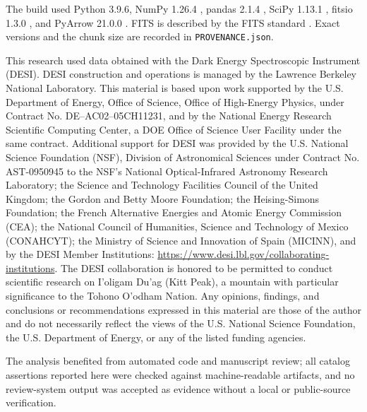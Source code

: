 \documentclass[twocolumn]{aastex701}
\begin{document}
The build used Python 3.9.6, NumPy 1.26.4 \citep{Harris2020}, pandas 2.1.4
\citep{McKinney2010}, SciPy 1.13.1 \citep{Virtanen2020}, fitsio 1.3.0
\citep{SheldonFitsio}, and PyArrow 21.0.0 \citep{ApacheArrow}.  FITS is described by
the FITS standard \citep{Pence2010}.  Exact versions and the chunk size are recorded in
\texttt{PROVENANCE.json}.

\begin{acknowledgments}
This research used data obtained with the Dark Energy Spectroscopic Instrument (DESI).  DESI
construction and operations is managed by the Lawrence Berkeley National Laboratory.  This
material is based upon work supported by the U.S. Department of Energy, Office of Science,
Office of High-Energy Physics, under Contract No. DE--AC02--05CH11231, and by the National Energy
Research Scientific Computing Center, a DOE Office of Science User Facility under the same
contract.  Additional support for DESI was provided by the U.S. National Science Foundation
(NSF), Division of Astronomical Sciences under Contract No. AST-0950945 to the NSF's National
Optical-Infrared Astronomy Research Laboratory; the Science and Technology Facilities Council
of the United Kingdom; the Gordon and Betty Moore Foundation; the Heising-Simons Foundation;
the French Alternative Energies and Atomic Energy Commission (CEA); the National Council of
Humanities, Science and Technology of Mexico (CONAHCYT); the Ministry of Science and Innovation
of Spain (MICINN), and by the DESI Member Institutions:
\url{https://www.desi.lbl.gov/collaborating-institutions}.  The DESI collaboration is honored to
be permitted to conduct scientific research on I'oligam Du'ag (Kitt Peak), a mountain with
particular significance to the Tohono O'odham Nation.  Any opinions, findings, and conclusions
or recommendations expressed in this material are those of the author and do not necessarily
reflect the views of the U.S. National Science Foundation, the U.S. Department of Energy, or
any of the listed funding agencies.

The analysis benefited from automated code and manuscript review; all catalog assertions
reported here were checked against machine-readable artifacts, and no review-system output was
accepted as evidence without a local or public-source verification.
\end{acknowledgments}
\end{document}
